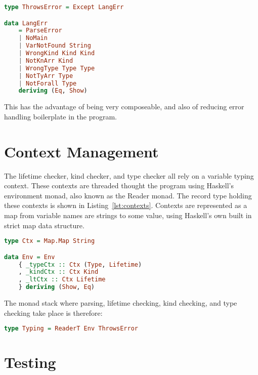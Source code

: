 \begin{lstlisting}[caption=Partially applied error monad and langauge errors., language=Haskell, label={lst:types}]
type ThrowsError = Except LangErr

data LangErr
    = ParseError
    | NoMain
    | VarNotFound String
    | WrongKind Kind Kind
    | NotKnArr Kind
    | WrongType Type Type
    | NotTyArr Type
    | NotForall Type
    deriving (Eq, Show)
\end{lstlisting}

This has the advantage of being very composeable, and also of reducing error
handling boilerplate in the program.

\section{Context Management}
The lifetime checker, kind checker, and type checker all rely on a variable
typing context. These contexts are threaded thought the program using Haskell's
environment monad, also known as the Reader monad. The record type holding these
contexts is shown in Listing~\ref{lst:contexts}. Contexts are represented as a
map from variable names are strings to some value, using Haskell's own built
in strict map data structure.

\begin{lstlisting}[caption=Record data type showing contexts., language=Haskell, label={lst:contexts}]
type Ctx = Map.Map String

data Env = Env
    { _typeCtx :: Ctx (Type, Lifetime)
    , _kindCtx :: Ctx Kind
    , _ltCtx :: Ctx Lifetime
    } deriving (Show, Eq)
\end{lstlisting}

The monad stack where parsing, lifetime checking, kind checking, and type checking take
place is therefore:

\begin{lstlisting}[caption=Envirnment and error monad stack., language=Haskell, label={lst:monads}]
type Typing = ReaderT Env ThrowsError
\end{lstlisting}

\section{Testing}
